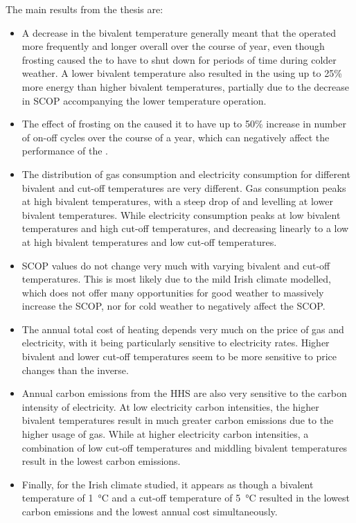 The main results from the thesis are:
\begin{itemize}
    \item A decrease in the bivalent temperature generally meant that the \HP operated more frequently and longer overall over the course of year, even though frosting caused the \HP to have to shut down for periods of time during colder weather. A lower bivalent temperature also resulted in the \HP using up to 25\% more energy than higher bivalent temperatures, partially due to the decrease in \ac{SCOP} accompanying the lower temperature operation.
    \item The effect of frosting on the \HP caused it to have up to 50\% increase in number of on-off cycles over the course of a year, which can negatively affect the performance of the \HP. 
    \item The distribution of gas consumption and electricity consumption for different bivalent and cut-off temperatures are very different. Gas consumption peaks at high bivalent temperatures, with a steep drop of and levelling at lower bivalent temperatures. While electricity consumption peaks at low bivalent temperatures and high cut-off temperatures, and decreasing linearly to a low at high bivalent temperatures and low cut-off temperatures. 
    \item \ac{SCOP} values do not change very much with varying bivalent and cut-off temperatures. This is most likely due to the mild Irish climate modelled, which does not offer many opportunities for good weather to massively increase the \ac{SCOP}, nor for cold weather to negatively affect the \ac{SCOP}. 
    \item The annual total cost of heating depends very much on the price of gas and electricity, with it being particularly sensitive to electricity rates. Higher bivalent and lower cut-off temperatures seem to be more sensitive to price changes than the inverse. 
    \item Annual carbon emissions from the \ac{HHS} are also very sensitive to the carbon intensity of electricity. At low electricity carbon intensities, the higher bivalent temperatures result in much greater carbon emissions due to the higher usage of gas. While at higher electricity carbon intensities, a combination of low cut-off temperatures and middling bivalent temperatures result in the lowest carbon emissions.
    \item Finally, for the Irish climate studied, it appears as though a bivalent temperature of \qty{1}{\celsius} and a cut-off temperature of \qty{5}{\celsius} resulted in the lowest carbon emissions and the lowest annual cost simultaneously.     
\end{itemize}





